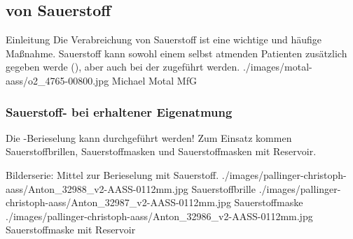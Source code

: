 \subsection{ von Sauerstoff}

\TextSlideTeaser
{Einleitung}%
{%
Die Verabreichung von Sauerstoff ist eine wichtige und häufige
Maßnahme. Sauerstoff kann sowohl einem selbst atmenden Patienten
zusätzlich gegeben werde (), aber auch bei der
 zugeführt werden. }%
{}%
{./images/motal-aass/o2_4765-00800.jpg}%
{}%
{}%
{Michael Motal}%
{MfG}%

\begin{Synopsis}
\end{Synopsis}

\subsubsection{Sauerstoff- bei erhaltener Eigenatmung}

\Text
{{\TxBeschreibung}}%
{%
%
%
%
\label{topic:berieselung}%
\label{topic:berieselungsbrille}%
\label{topic:berieselungsmaske}%
Die -Berieselung kann  durchgeführt werden! Zum Einsatz kommen
Sauerstoffbrillen, Sauerstoffmasken und
Sauerstoffmasken mit Reservoir.
}%



% 
% 
% 

\begin{PictureSeriesWide}{}
{Bilderserie: Mittel zur Berieselung mit Sauerstoff. }
{./images/pallinger-christoph-aass/Anton_32988_v2-AASS-0112mm.jpg}
{Sauerstoffbrille}
{./images/pallinger-christoph-aass/Anton_32987_v2-AASS-0112mm.jpg}
{Sauerstoffmaske}
{./images/pallinger-christoph-aass/Anton_32986_v2-AASS-0112mm.jpg}
{Sauerstoffmaske mit Reservoir}
{}
{}
\end{PictureSeriesWide}




